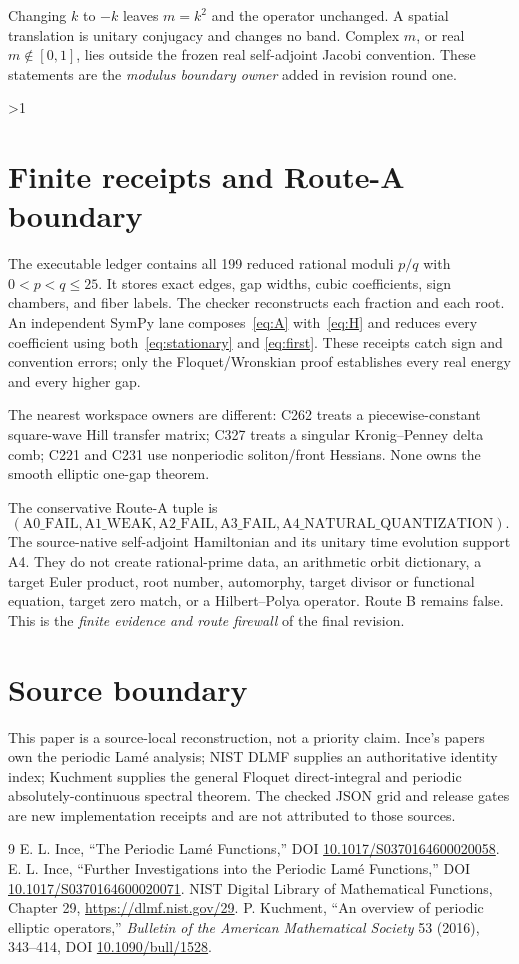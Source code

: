 \documentclass[10pt]{article}
\providecommand{\CRevisionRound}{2}
\begin{document}
Changing $k$ to $-k$ leaves $m=k^2$ and the operator unchanged.  A spatial
translation is unitary conjugacy and changes no band.  Complex $m$, or real
$m\notin[0,1]$, lies outside the frozen real self-adjoint Jacobi convention.
These statements are the \emph{modulus boundary owner} added in revision
round one.
\fi

\ifnum\CRevisionRound>1
\section{Finite receipts and Route-A boundary}
The executable ledger contains all 199 reduced rational moduli $p/q$ with
$0<p<q\le25$.  It stores exact edges, gap widths, cubic coefficients, sign
chambers, and fiber labels.  The checker reconstructs each fraction and each
root.  An independent SymPy lane composes~\eqref{eq:A} with~\eqref{eq:H}
and reduces every coefficient using both~\eqref{eq:stationary} and
\eqref{eq:first}.  These receipts catch sign and convention errors; only the
Floquet/Wronskian proof establishes every real energy and every higher gap.

The nearest workspace owners are different: C262 treats a piecewise-constant
square-wave Hill transfer matrix; C327 treats a singular Kronig--Penney
delta comb; C221 and C231 use nonperiodic soliton/front Hessians.  None owns
the smooth elliptic one-gap theorem.

The conservative Route-A tuple is
\[
 (\mathrm{A0\_FAIL},\mathrm{A1\_WEAK},\mathrm{A2\_FAIL},
  \mathrm{A3\_FAIL},\mathrm{A4\_NATURAL\_QUANTIZATION}).
\]
The source-native self-adjoint Hamiltonian and its unitary time evolution
support A4.  They do not create rational-prime data, an arithmetic orbit
dictionary, a target Euler product, root number, automorphy, target divisor
or functional equation, target zero match, or a Hilbert--Polya operator.
Route B remains false.  This is the \emph{finite evidence and route firewall}
of the final revision.
\fi

\section*{Source boundary}
This paper is a source-local reconstruction, not a priority claim.  Ince's
papers own the periodic Lam\'e analysis; NIST DLMF supplies an authoritative
identity index; Kuchment supplies the general Floquet direct-integral and
periodic absolutely-continuous spectral theorem.  The checked JSON grid and
release gates are new implementation receipts and are not attributed to
those sources.

\begin{thebibliography}{9}
E. L. Ince, ``The Periodic Lam\'e Functions,'' DOI
\url{10.1017/S0370164600020058}.
E. L. Ince, ``Further Investigations into the Periodic Lam\'e Functions,''
DOI \url{10.1017/S0370164600020071}.
NIST Digital Library of Mathematical Functions, Chapter 29,
\url{https://dlmf.nist.gov/29}.
P. Kuchment, ``An overview of periodic elliptic operators,''
\emph{Bulletin of the American Mathematical Society} 53 (2016), 343--414,
DOI \url{10.1090/bull/1528}.
\end{thebibliography}
\end{document}
